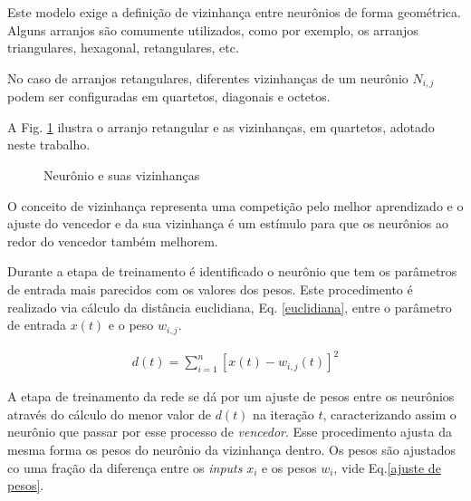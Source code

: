 Este modelo exige a definição de vizinhança entre neurônios de forma geométrica. Alguns arranjos são comumente utilizados, como por exemplo, os arranjos triangulares, hexagonal, retangulares, etc.

No caso de arranjos retangulares, diferentes vizinhanças de um neurônio
$N_{i,j}$ podem ser configuradas em quartetos, diagonais e octetos. 

A Fig. \ref{hiperplano} ilustra o arranjo retangular e as vizinhanças, em quartetos, adotado neste trabalho. 

\begin{figure}[H]
	\centering
	\setlength{\fboxsep}{8pt}
	\setlength{\fboxrule}{0.1pt}
	\caption{Neurônio e suas vizinhanças}
	\label{hiperplano}
\end{figure}

O conceito de vizinhança representa uma competição pelo melhor aprendizado e o ajuste do vencedor e da sua vizinhança é um estímulo para que os neurônios ao redor do vencedor também melhorem.

Durante a etapa de treinamento é identificado o neurônio que tem os parâmetros de entrada mais parecidos com os valores dos pesos. Este procedimento é realizado via cálculo da distância euclidiana, Eq. \ref{euclidiana}, entre o parâmetro de entrada $x(t)$ e o peso $w_{i,j}$.

\begin{eqnarray}
d(t)= \sum^{n}_{i=1}[x(t)-w_{i,j}(t)]^{2}
\label{euclidiana}
\end{eqnarray}

A etapa de treinamento da rede se dá por um ajuste de pesos entre os neurônios através do cálculo do menor valor de $d(t)$ na iteração $t$, caracterizando assim o neurônio que passar por esse processo de \textit{vencedor}. Esse procedimento ajusta da mesma forma os pesos do neurônio da vizinhança dentro. Os pesos são ajustados co uma fração da diferença entre os \textit{inputs} $x_{i}$ e os pesos $w_{i}$, vide Eq.\ref{ajuste de pesos}.

